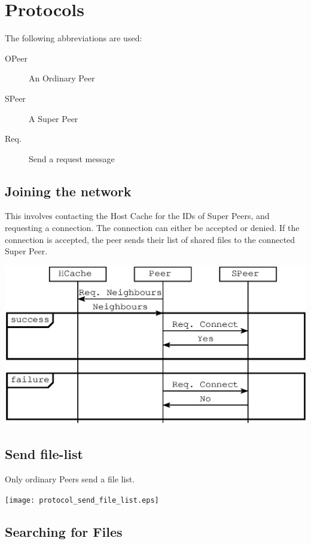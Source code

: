 \section{Protocols}

\secttoc

The following abbreviations are used:

\begin{description}
  \item[OPeer] An Ordinary Peer
  \item[SPeer] A Super Peer
  \item[Req.] Send a request message
\end{description}

\subsection{Joining the network}

This involves contacting the Host Cache for the IDs of Super Peers, and
requesting a connection.  The connection can either be accepted or denied. If
the connection is accepted, the peer sends their list of shared files to the
connected Super Peer.

\includegraphics{protocol_connect.eps}

\subsection{Send file-list}

Only ordinary Peers send a file list.

\texttt{[image: protocol\_send\_file\_list.eps]}

\subsection{Searching for Files}

